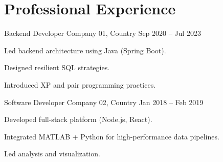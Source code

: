 \section*{Professional Experience}

\experience
  {Backend Developer}
  {Company 01, Country}
  {Sep 2020 – Jul 2023}
  {
    \item Led backend architecture using Java (Spring Boot).
    \item Designed resilient SQL strategies.
    \item Introduced XP and pair programming practices.
  }

\vspace{0.5em}

\experience
  {Software Developer}
  {Company 02, Country}
  {Jan 2018 – Feb 2019}
  {
    \item Developed full-stack platform (Node.js, React).
    \item Integrated MATLAB + Python for high-performance data pipelines.
    \item Led analysis and visualization.
  }
